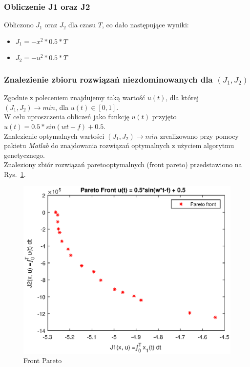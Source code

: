 \documentclass[a4paper]{article}
\begin{document}
    
 

\subsubsection{Obliczenie J1 oraz J2}
\label{step:1}
Obliczono $J_1$ oraz $J_2$ dla czasu $T$, co dało następujące wyniki:
\begin{itemize}
    \item $J_1 = - x^2 * 0.5 * T $
    \item $J_2 = - u^2 * 0.5 * T $
\end{itemize}
 
\subsubsection{Znalezienie zbioru rozwiązań niezdominowanych dla $(J_1, J_2)$}
\label{step:2}

Zgodnie z poleceniem znajdujemy taką wartość $u(t)$, dla której $(J_1, J_2) \rightarrow min$, dla $u(t) \in  [0,1]$.
\\
W celu uproszczenia obliczeń jako funkcję $u(t)$ przyjęto $u(t) = 0.5*sin(wt + f)+0.5$.
\\
Znalezienie optymalnych wartości $(J_1, J_2) \rightarrow min$ zrealizowano przy pomocy pakietu \textit{Matlab} do znajdowania rozwiązań optymalnych z użyciem algorytmu genetycznego.
\\
Znaleziony zbiór rozwiązań paretooptymalnych (front pareto) przedstawiono na Rys.~\ref{fig:pareto_front}. 
\begin{figure}[H]
    \centering
    \includegraphics{pareto_front.eps}
    \caption{Front Pareto}
    \label{fig:pareto_front}
\end{figure}
\end{document}
